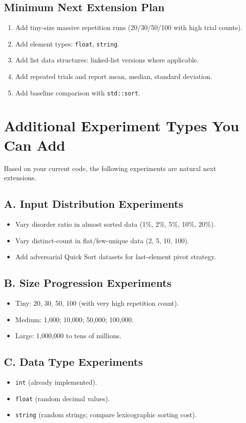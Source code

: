 \documentclass[12pt,a4paper]{article}
\begin{document}
\subsection{Minimum Next Extension Plan}
\begin{enumerate}
    \item Add tiny-size massive repetition runs (20/30/50/100 with high trial counts).
    \item Add element types: \texttt{float}, \texttt{string}.
    \item Add list data structures: linked-list versions where applicable.
    \item Add repeated trials and report mean, median, standard deviation.
    \item Add baseline comparison with \texttt{std::sort}.
\end{enumerate}

\section{Additional Experiment Types You Can Add}
Based on your current code, the following experiments are natural next extensions.

\subsection{A. Input Distribution Experiments}
\begin{itemize}
    \item Vary disorder ratio in almost sorted data (1\%, 2\%, 5\%, 10\%, 20\%).
    \item Vary distinct-count in flat/few-unique data (2, 5, 10, 100).
    \item Add adversarial Quick Sort datasets for last-element pivot strategy.
\end{itemize}

\subsection{B. Size Progression Experiments}
\begin{itemize}
    \item Tiny: 20, 30, 50, 100 (with very high repetition count).
    \item Medium: 1,000; 10,000; 50,000; 100,000.
    \item Large: 1,000,000 to tens of millions.
\end{itemize}

\subsection{C. Data Type Experiments}
\begin{itemize}
    \item \texttt{int} (already implemented).
    \item \texttt{float} (random decimal values).
    \item \texttt{string} (random strings; compare lexicographic sorting cost).
\end{itemize}
\end{document}
